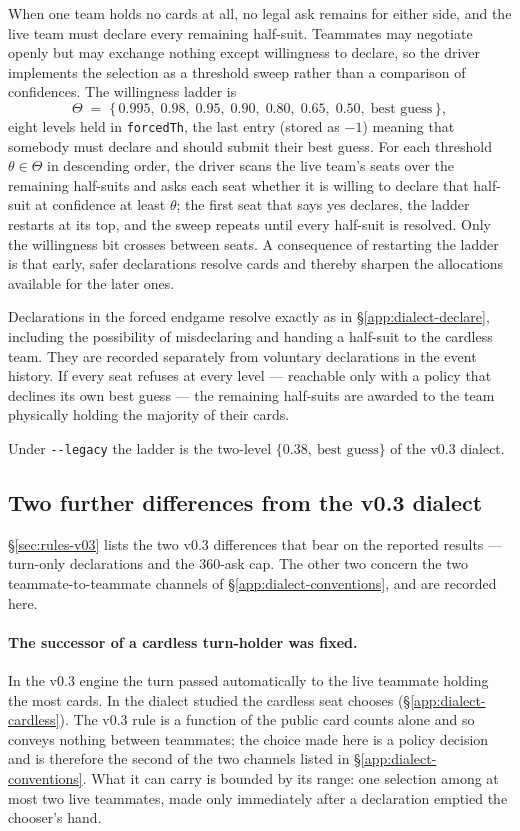 \documentclass[11pt]{article}
\theoremstyle{definition}
\begin{document}
When one team holds no cards at all, no legal ask remains for either side, and
the live team must declare every remaining half-suit. Teammates may negotiate
openly but may exchange nothing except willingness to declare, so the driver
implements the selection as a threshold sweep rather than a comparison of
confidences. The willingness ladder is
\[
  \Theta \;=\; \{\,0.995,\; 0.98,\; 0.95,\; 0.90,\; 0.80,\; 0.65,\; 0.50,\;
  \text{best guess}\,\},
\]
eight levels held in \texttt{forcedTh}, the last entry (stored as $-1$) meaning
that somebody must declare and should submit their best guess. For each
threshold $\theta \in \Theta$ in descending order, the driver scans the live
team's seats over the remaining half-suits and asks each seat whether it is
willing to declare that half-suit at confidence at least $\theta$; the first
seat that says yes declares, the ladder restarts at its top, and the sweep
repeats until every half-suit is resolved. Only the willingness bit crosses
between seats. A consequence of restarting the ladder is that early, safer
declarations resolve cards and thereby sharpen the allocations available for the
later ones.

Declarations in the forced endgame resolve exactly as in
\S\ref{app:dialect-declare}, including the possibility of misdeclaring and
handing a half-suit to the cardless team. They are recorded separately from
voluntary declarations in the event history. If every seat refuses at every
level --- reachable only with a policy that declines its own best guess --- the
remaining half-suits are awarded to the team physically holding the majority of
their cards.

Under \texttt{-{}-legacy} the ladder is the two-level
$\{0.38,\ \text{best guess}\}$ of the v0.3 dialect.

\subsection{Two further differences from the v0.3 dialect}
\label{app:dialect-vthree}

\S\ref{sec:rules-v03} lists the two v0.3 differences that bear on the reported
results --- turn-only declarations and the 360-ask cap. The other two concern
the two teammate-to-teammate channels of \S\ref{app:dialect-conventions}, and
are recorded here.

\paragraph{The successor of a cardless turn-holder was fixed.} In the v0.3
engine \cite{fishbot03} the turn passed automatically to the live teammate
holding the most cards. In the dialect studied the cardless seat chooses
(\S\ref{app:dialect-cardless}). The v0.3 rule is a function of the public card
counts alone and so conveys nothing between teammates; the choice made here is a
policy decision and is therefore the second of the two channels listed in
\S\ref{app:dialect-conventions}. What it can carry is bounded by its range: one
selection among at most two live teammates, made only immediately after a
declaration emptied the chooser's hand.
\end{document}
